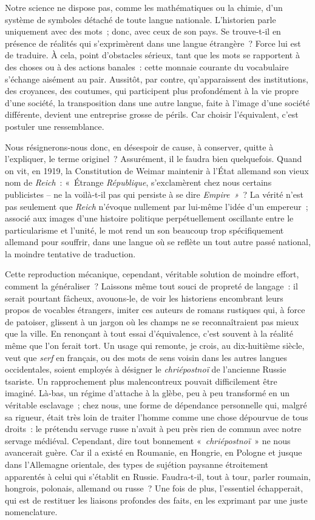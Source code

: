 \documentclass[french,twoside]{book} %
\begin{document}
\noindent Notre science ne dispose pas, comme les mathématiques ou la chimie, d’un système de symboles détaché de toute langue nationale. L’historien parle uniquement avec des mots ; donc, avec ceux de son pays. Se trouve-­t‑il en présence de réalités qui s’exprimèrent dans une langue étrangère ? Force lui est de traduire. À cela, point d’obstacles sérieux, tant que les mots se rapportent à des choses ou à des actions banales : cette monnaie courante du vocabulaire s’échange aisément au pair. Aussitôt, par contre, qu’apparaissent des institutions, des croyances, des coutumes, qui parti­cipent plus profondément à la vie propre d’une société, la transposition dans une autre langue, faite à l’image d’une société différente, devient une entreprise grosse de périls. Car choisir l’équivalent, c’est postuler une ressemblance.\par
Nous résignerons‑nous donc, en désespoir de cause, à conserver, quitte à l’expliquer, le terme originel ? Assurément, il le faudra bien quelquefois. Quand on vit, en 1919, la Constitution de Weimar maintenir à l’État allemand son vieux nom de \emph{Reich} : « Étrange\emph{ République}, s’exclamèrent chez nous certains publicistes – ne la voilà‑t‑il pas qui persiste à se dire \emph{Empire »} ? La vérité n’est pas seulement que \emph{Reich} n’évoque nullement par lui-même l’idée d’un empereur ; associé aux images d’une histoire politique perpétuellement oscillante entre le particularisme et l’unité, le mot rend un son beaucoup trop spécifiquement allemand pour souffrir, dans une langue où se reflète un tout autre passé national, la moindre tentative de traduction.\par
Cette reproduction mécanique, cependant, véritable solution de moindre effort, comment la généraliser ? Laissons même tout souci de propreté de langage : il serait pourtant fâcheux, avouons‑le, de voir les historiens encombrant leurs propos de vocables étrangers, imiter ces auteurs de romans rustiques qui, à force de patoiser, glissent à un jargon où les champs ne se reconnaîtraient pas mieux que la ville. En renonçant à tout essai d’équivalence, c’est souvent à la réalité même que l’on ferait tort. Un usage qui remonte, je crois, au dix‑huitième siècle, veut que \emph{serf} en français, ou des mots de sens voisin dans les autres langues  
\label{p83} occidentales, soient employés à désigner le \emph{chriépostnoï} de l’ancienne Russie tsariste. Un rapprochement plus malencontreux pouvait difficilement être imaginé. Là‑bas, un régime d’attache à la glèbe, peu à peu transformé en un véritable esclavage ; chez nous, une forme de dépendance person­nelle qui, malgré sa rigueur, était très loin de traiter l’homme comme une chose dépourvue de tous droits : le prétendu servage russe n’avait à peu près rien de commun avec notre servage médiéval. Cependant, dire tout bonnement « \emph{chriépostnoï} » ne nous avancerait guère. Car il a existé en Roumanie, en Hongrie, en Pologne et jusque dans l’Allemagne orien­tale, des types de sujétion paysanne étroitement apparentés à celui qui s’établit en Russie. Faudra‑t‑il, tout à tour, parler roumain, hongrois, polonais, allemand ou russe ? Une fois de plus, l’essentiel échapperait, qui est de restituer les liaisons profondes des faits, en les exprimant par une juste nomenclature.\par
\end{document}
